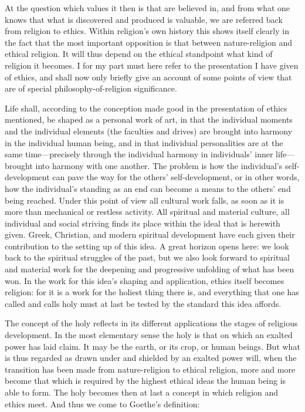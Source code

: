 \documentclass[12pt,a4paper]{book}
\newcommand{\opage}[1]{\marginnote{\footnotesize\textit{[#1]}}}
\begin{document}
At the question which values it then is that are believed in, and from what one knows that what is
discovered and produced is valuable, we are referred back from religion to ethics. Within religion's
own history this shows itself clearly in the fact that the most important opposition is that between
nature-religion and ethical religion. It will thus depend on the ethical standpoint what kind of
religion it becomes. I for my part must here refer to the presentation I have given of ethics, and
shall now only briefly give an account of some points of view that are of special
philosophy-of-religion significance.

Life shall, according to the conception made good in the presentation of ethics mentioned, be shaped
as a personal work of art, in that the individual moments and the individual elements (the faculties
and drives) are brought into harmony in the individual human being, and in that individual
personalities are at the same time---precisely through the individual harmony in individuals' inner
life---brought into harmony with one another. The problem is how the individual's self-development can
pave the way for the others' self-development, or in other words, how the individual's standing as an
end 
\opage{239}can become a means to the others' end being reached. Under this point of view all cultural work
falls, as soon as it is more than mechanical or restless activity. All spiritual and material culture,
all individual and social striving finds its place within the ideal that is herewith given. Greek,
Christian, and modern spiritual development have each given their contribution to the setting up of
this idea. A great horizon opens here: we look back to the spiritual struggles of the past, but we
also look forward to spiritual and material work for the deepening and progressive unfolding of what
has been won. In the work for this idea's shaping and application, ethics itself becomes religion: for
it is a work for the holiest thing there is, and everything that one has called and calls holy must at
last be tested by the standard this idea affords.

The concept of the holy reflects in its different applications the stages of religious development. In
the most elementary sense the holy is that on which an exalted power has laid claim. It may be the
earth, or its crop, or human beings. But what is thus regarded as drawn under and shielded by an exalted
power will, when the transition has been made from nature-religion to ethical religion, more and more
become that which is required by the highest ethical ideas the human being is able to form. The holy
becomes then at last a concept in which religion and ethics meet. And thus we come to Goethe's
definition:
\end{document}
